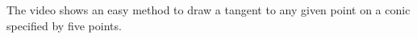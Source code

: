 The video shows an easy method to draw a tangent to any given point on a conic specified by five points.